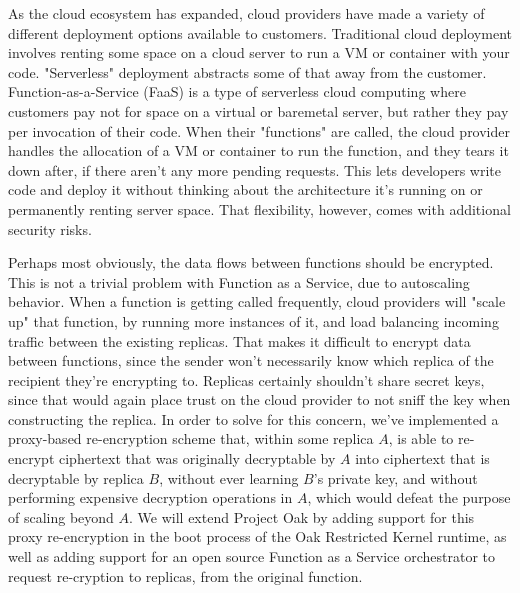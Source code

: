 As the cloud ecosystem has expanded, cloud providers have made a variety of different deployment options available to customers.
Traditional cloud deployment involves renting some space on a cloud server to run a VM or container with your code.
"Serverless" deployment abstracts some of that away from the customer.
Function-as-a-Service (FaaS) is a type of serverless cloud computing where customers pay not for space on a virtual or baremetal server, but rather they pay per invocation of their code.
When their "functions" are called, the cloud provider handles the allocation of a VM or container to run the function, and they tears it down after, if there aren't any more pending requests.
This lets developers write code and deploy it without thinking about the architecture it's running on or permanently renting server space. That flexibility, however, comes with additional security risks.

Perhaps most obviously, the data flows between functions should be encrypted.
This is not a trivial problem with Function as a Service, due to autoscaling behavior.
When a function is getting called frequently, cloud providers will "scale up" that function, by running more instances of it, and load balancing incoming traffic between the existing replicas.
That makes it difficult to encrypt data between functions, since the sender won't necessarily know which replica of the recipient they're encrypting to.
Replicas certainly shouldn't share secret keys, since that would again place trust on the cloud provider to not sniff the key when constructing the replica.
In order to solve for this concern, we've implemented a proxy-based re-encryption scheme that, within some replica $A$, is able to re-encrypt ciphertext that was originally decryptable by $A$ into ciphertext that is decryptable by replica $B$, without ever learning $B$'s private key, and without performing expensive decryption operations in $A$, which would defeat the purpose of scaling beyond $A$.
We will extend Project Oak by adding support for this proxy re-encryption in the boot process of the Oak Restricted Kernel runtime, as well as adding support for an open source Function as a Service orchestrator to request re-cryption to replicas, from the original function.

